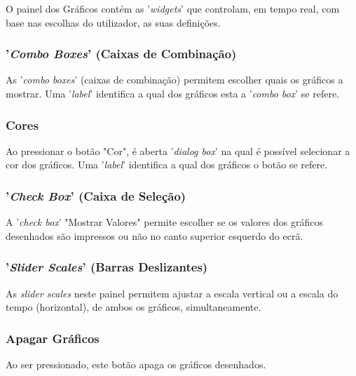 \documentclass{article}
\begin{document}
O painel dos Gráficos contém as '\textit{widgets}' que controlam, em tempo real, com base nas escolhas do utilizador, as suas definições.

\subsubsection{'\textit{Combo Boxes}' (Caixas de Combinação)}

As  '\textit{combo boxes}' (caixas de combinação) permitem escolher quais os gráficos a mostrar. Uma '\textit{label}' identifica a qual dos gráficos esta a '\textit{combo box}' se refere.

\subsubsection{Cores}
Ao pressionar o botão "Cor", é aberta '\textit{dialog box}' na qual é possível selecionar a cor dos gráficos. Uma '\textit{label}' identifica a qual dos gráficos o botão se refere.

\subsubsection{'\textit{Check Box}' (Caixa de Seleção)}

A '\textit{check box}' "Mostrar Valores"  permite escolher se os valores dos gráficos desenhados são impressos ou não no canto superior esquerdo do ecrã.

\subsubsection{'\textit{Slider Scales}' (Barras Deslizantes)}

As \textit{slider scales} neste painel permitem ajustar a escala vertical ou a escala do tempo (horizontal), de ambos os gráficos, simultaneamente.

\subsubsection{Apagar Gráficos}

Ao ser pressionado, este botão apaga os gráficos desenhados.



\end{document}
